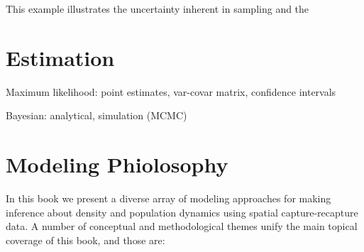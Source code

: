This
example illustrates the uncertainty inherent in sampling and the





\section{Estimation}


Maximum likelihood: point estimates, var-covar matrix, confidence
intervals

Bayesian: analytical, simulation (MCMC)







\section{Modeling Phiolosophy}

In this book we present a diverse array of modeling approaches for making
inference about density and population dynamics using spatial
capture-recapture data. A number of conceptual and
methodological themes unify the main topical coverage of this book, and
those are:

